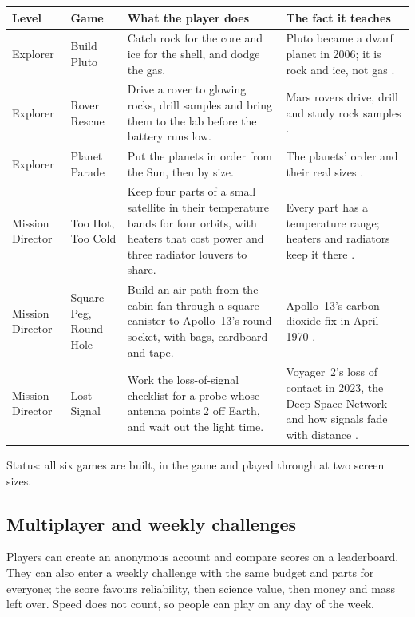 \documentclass[11pt,a4paper]{article}
\begin{document}
\begin{table}[H]
\centering\small
\begin{tabularx}{\textwidth}{@{}l p{3.3cm} L L@{}}
\toprule
\textbf{Level} & \textbf{Game} & \textbf{What the player does} & \textbf{The fact it teaches} \\
\midrule
Explorer & Build Pluto & Catch rock for the core and ice for the shell, and dodge the gas. & Pluto became a dwarf planet in 2006; it is rock and ice, not gas \cite{pluto, spaceplace}. \\
Explorer & Rover Rescue & Drive a rover to glowing rocks, drill samples and bring them to the lab before the battery runs low. & Mars rovers drive, drill and study rock samples \cite{perseverance, curiosity}. \\
Explorer & Planet Parade & Put the planets in order from the Sun, then by size. & The planets' order and their real sizes \cite{planetfacts}. \\
Mission Director & Too Hot, Too Cold & Keep four parts of a small satellite in their temperature bands for four orbits, with heaters that cost power and three radiator louvers to share. & Every part has a temperature range; heaters and radiators keep it there \cite{thermal}. \\
Mission Director & Square Peg, Round Hole & Build an air path from the cabin fan through a square canister to Apollo~13's round socket, with bags, cardboard and tape. & Apollo~13's carbon dioxide fix in April 1970 \cite{apollo13}. \\
Mission Director & Lost Signal & Work the loss-of-signal checklist for a probe whose antenna points 2\textdegree{} off Earth, and wait out the light time. & Voyager~2's loss of contact in 2023, the Deep Space Network and how signals fade with distance \cite{voyager2, dsn}. \\
\bottomrule
\end{tabularx}
\end{table}
\noindent Status: all six games are built, in the game and played through at two screen sizes.

\subsection{Multiplayer and weekly challenges}
Players can create an anonymous account and compare scores on a leaderboard. They can also enter a weekly
challenge with the same budget and parts for everyone; the score favours reliability, then science value, then money
and mass left over. Speed does not count, so people can play on any day of the week.
\end{document}
